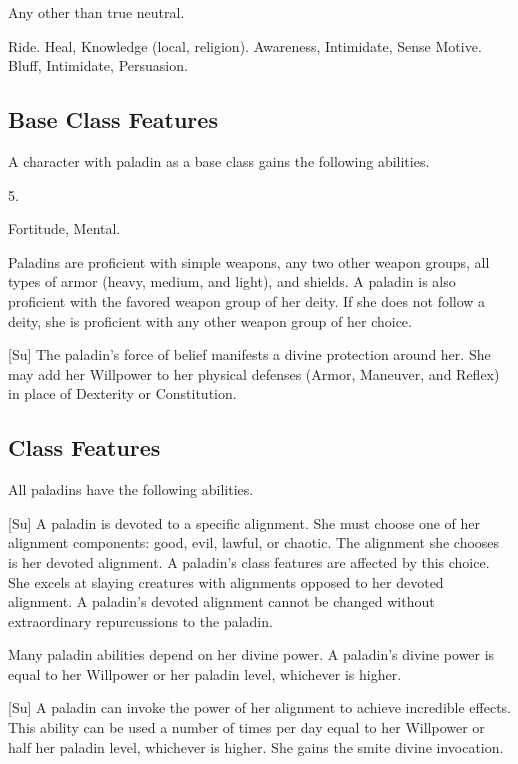  Any other than true neutral.

 Ride.
 Heal, Knowledge (local, religion).
 Awareness, Intimidate, Sense Motive.
 Bluff, Intimidate, Persuasion.

\subsection{Base Class Features}
A character with paladin as a base class gains the following abilities.

 5.

  Fortitude,  Mental.

 Paladins are proficient with simple weapons,  any two other weapon groups,  all types of armor (heavy, medium, and light), and shields.
A paladin is also proficient with the favored weapon group of her deity.
If she does not follow a deity, she is proficient with any other weapon group of her choice.

[Su]
The paladin's force of belief manifests a divine protection around her.
She may add her Willpower to her physical defenses (Armor, Maneuver, and Reflex) in place of Dexterity or Constitution.

\subsection{Class Features}
All paladins have the following abilities.

[Su]
A paladin is devoted to a specific alignment.
She must choose one of her alignment components: good, evil, lawful, or chaotic.
The alignment she chooses is her devoted alignment.
A paladin's class features are affected by this choice.
She excels at slaying creatures with alignments opposed to her devoted alignment.
A paladin's devoted alignment cannot be changed without extraordinary repurcussions to the paladin.

Many paladin abilities depend on her divine power.
A paladin's divine power is equal to her Willpower or her paladin level, whichever is higher.

[Su]
A paladin can invoke the power of her alignment to achieve incredible effects.
This ability can be used a number of times per day equal to her Willpower or half her paladin level, whichever is higher.
She gains the smite divine invocation.

